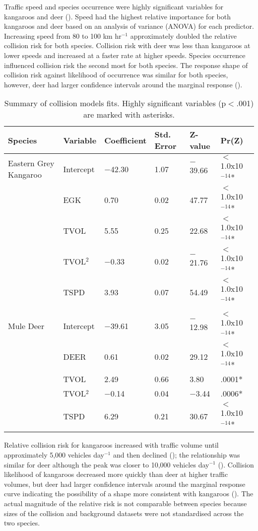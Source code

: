 Traffic speed and species occurrence were highly significant variables for kangaroos and deer (). Speed had the highest relative importance for both kangaroos and deer based on an analysis of variance (ANOVA) for each predictor. Increasing speed from 80 to 100 km hr$^{-1}$ approximately doubled the relative collision risk for both species.  Collision risk with deer was less than kangaroos at lower speeds and increased at a faster rate at higher speeds. Species occurrence influenced collision risk the second most for both species.  The response shape of collision risk against likelihood of occurrence was similar for both species, however, deer had larger confidence intervals around the marginal response ().

\begin{table}[htp]
\caption[Summary of collision models for kangaroos and deer]{Summary of collision models fits.  Highly significant variables (p$<$.001) are marked with asterisks.}
\begin{tabularx}{0.9\textwidth}{llllll} \toprule
Species					&Variable		&Coefficient	&Std. Error		&Z-value	&Pr(Z) \\ \midrule
Eastern Grey Kangaroo	&Intercept		&$-$42.30			&1.07		&$-$39.66	&$<$1.0x10$^{-14}$* \\
						&EGK			&0.70			&0.02			&47.77		&$<$1.0x10$^{-14}$* \\
						&TVOL			&5.55			&0.25			&22.68		&$<$1.0x10$^{-14}$* \\
						&TVOL$^2$		&$-$0.33		&0.02			&$-$21.76	&$<$1.0x10$^{-14}$* \\
						&TSPD			&3.93			&0.07			&54.49		&$<$1.0x10$^{-14}$* \\
&&&&& \\
Mule Deer				&Intercept		&$-$39.61		&3.05			&$-$12.98	&$<$1.0x10$^{-14}$* \\
						&DEER			&0.61			&0.02			&29.12		&$<$1.0x10$^{-14}$* \\
						&TVOL			&2.49			&0.66			&3.80		&.0001* \\
						&TVOL$^2$		&$-$0.14		&0.04			&$-$3.44	&.0006* \\
						&TSPD			&6.29			&0.21			&30.67		&$<$1.0x10$^{-14}$* \\
\bottomrule
\end{tabularx}
\label{cal_model_fits}
\end{table}

Relative collision risk  for kangaroos increased with traffic volume until approximately 5,000 vehicles day$^{-1}$ and then declined (); the relationship was similar for deer although the peak was closer to 10,000 vehicles day$^{-1}$ (). Collision likelihood of kangaroos decreased more quickly than deer at higher traffic volumes, but deer had larger confidence intervals around the marginal response curve indicating the possibility of a shape more consistent with kangaroos (). The actual magnitude of the relative risk is not comparable between species because sizes of the collision and background datasets were not standardised across the two species.

